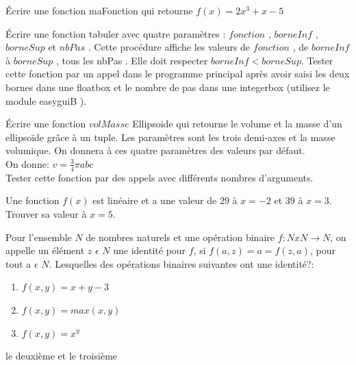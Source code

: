 \begin{exercise}
Écrire une fonction maFonction qui retourne $f(x) = 2x^{3} + x - 5$
\end{exercise}

\begin{exercise}
Écrire une fonction tabuler avec quatre paramètres : $fonction$ , $borneInf$ , $borneSup$
et $nbPas$ . Cette procédure affiche les valeurs de $fonction$ , de $borneInf$ à $borneSup$ ,
tous les nbPas . Elle doit respecter $borneInf < borneSup$.
Tester cette fonction par un appel dans le programme principal après avoir saisi les
deux bornes dans une floatbox et le nombre de pas dans une integerbox (utilisez le
module easyguiB ).
\end{exercise}

\begin{exercise}
Écrire une fonction $volMasse$ Ellipsoide qui retourne le volume et la masse d’un ellipsoïde grâce à un tuple. Les paramètres sont les trois demi-axes et la masse volumique. On donnera à ces quatre paramètres des valeurs par défaut. \\
On donne: $v = \frac{3}{4} \pi abc$ \\
Tester cette fonction par des appels avec différents nombres d’arguments.
\end{exercise}

\begin{exercise}
Une fonction $f (x)$ est lin\'eaire et a une valeur de $29$ \`a $x = -2$ et $39$ à $x = 3$. Trouver sa valeur à $x = 5$.
\end{exercise}

\begin{exercise}
Pour l'ensemble $N$ de nombres naturels et une opération binaire $f: N x N \longrightarrow N$, on appelle un élément $z$ $\epsilon$ $N$ une identité pour $f$, si $f (a, z) = a = f (z, a)$, pour tout a $\epsilon$ $N$. Lesquelles des opérations binaires suivantes ont une identité?:
\begin{enumerate}
  \item $f (x, y) = x + y - 3$
  \item $f (x, y) = max(x, y)$
  \item $f (x, y) = x^{y}$
\end{enumerate}
\end{exercise}
\begin{solution}
le deuxième et le troisième 
\end{solution}

